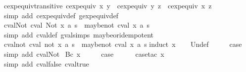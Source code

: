 \begin{isabellebody}
\isamarkupfalse%
\ cexp{\isacharunderscore}equiv{\isacharunderscore}transitive{\isacharcolon}\ {\isachardoublequoteopen}cexp{\isacharunderscore}equiv\ x\ y\ {\isasymLongrightarrow}\ cexp{\isacharunderscore}equiv\ y\ z\ {\isasymLongrightarrow}\ cexp{\isacharunderscore}equiv\ x\ z{\isachardoublequoteclose}\isanewline
%
\isadelimproof
\ \ %
\endisadelimproof
%
\isatagproof
{}\isamarkupfalse%
\ {\isacharparenleft}simp\ add{\isacharcolon}\ cexp{\isacharunderscore}equiv{\isacharunderscore}def\ gexp{\isacharunderscore}equiv{\isacharunderscore}def{\isacharparenright}%
\endisatagproof
{\isafoldproof}%
%
\isadelimproof
\isanewline
%
\endisadelimproof
\isanewline
{}\isamarkupfalse%
\ cval{\isacharunderscore}Not{\isacharcolon}\ {\isachardoublequoteopen}cval\ {\isacharparenleft}Not\ x{\isacharparenright}\ a\ s\ {\isacharequal}\ maybe{\isacharunderscore}not\ {\isacharparenleft}cval\ x\ a\ s{\isacharparenright}{\isachardoublequoteclose}\isanewline
%
\isadelimproof
\ \ %
\endisadelimproof
%
\isatagproof
{}\isamarkupfalse%
\ {\isacharparenleft}simp\ add{\isacharcolon}\ cval{\isacharunderscore}def\ gval{\isachardot}simps\ maybe{\isacharunderscore}or{\isacharunderscore}idempotent{\isacharparenright}%
\endisatagproof
{\isafoldproof}%
%
\isadelimproof
\isanewline
%
\endisadelimproof
\isanewline
{}\isamarkupfalse%
\ cval{\isacharunderscore}not{\isacharcolon}\ {\isachardoublequoteopen}cval\ {\isacharparenleft}not\ x{\isacharparenright}\ a\ s\ {\isacharequal}\ maybe{\isacharunderscore}not\ {\isacharparenleft}cval\ x\ a\ s{\isacharparenright}{\isachardoublequoteclose}\isanewline
%
\isadelimproof
%
\endisadelimproof
%
\isatagproof
{}\isamarkupfalse%
{\isacharparenleft}induct\ x{\isacharparenright}\isanewline
\ \ \isamarkupfalse%
\ Undef\isanewline
\ \ \isamarkupfalse%
\ \isamarkupfalse%
\ {\isacharquery}case\ \isamarkupfalse%
\ {\isacharparenleft}simp\ add{\isacharcolon}\ cval{\isacharunderscore}Not{\isacharparenright}\isanewline
{}\isamarkupfalse%
\isanewline
{}\isamarkupfalse%
\ {\isacharparenleft}Bc\ x{\isacharparenright}\isanewline
\ \ \isamarkupfalse%
\ \isamarkupfalse%
\ {\isacharquery}case\isanewline
\ \ \ \ \isamarkupfalse%
\ {\isacharparenleft}case{\isacharunderscore}tac\ x{\isacharparenright}\isanewline
\ \ \ \ \ \isamarkupfalse%
\ {\isacharparenleft}simp\ add{\isacharcolon}\ cval{\isacharunderscore}false\ cval{\isacharunderscore}true{\isacharparenright}\isanewline

\end{isabellebody}
